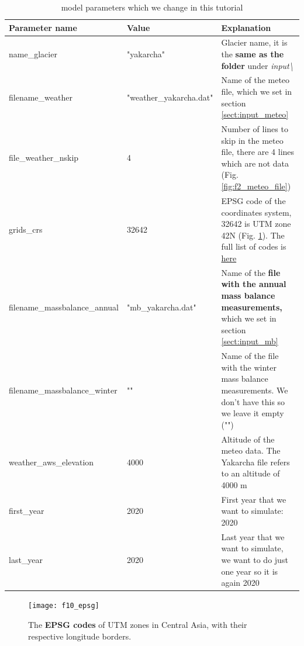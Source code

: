 \documentclass[15pt]{extarticle}
\begin{document}
\begin{table}[h!]
\caption{model parameters which we change in this tutorial}
\label{table:t1_parameters}
\centering
\begin{tabularx}{\textwidth}{|l l X|} 
 \hline
 \textbf{Parameter name} & \textbf{Value} & \textbf{Explanation} \\ [0.5ex] 
 \hline
 name\_glacier & "yakarcha" & Glacier name, it is the \textbf{same as the folder} under \textit{input\textbackslash} \\ 
 \hline
 filename\_weather & "weather\_yakarcha.dat" & Name of the meteo file, which we set in section \ref{sect:input_meteo} \\
 \hline
 file\_weather\_nskip & 4 & Number of lines to skip in the meteo file, there are 4 lines which are not data (Fig. \ref{fig:f2_meteo_file}) \\
 \hline
 grids\_crs & 32642 & EPSG code of the coordinates system, 32642 is UTM zone 42N (Fig. \ref{fig:f10_epsg}). The full list of codes is \href{https://spatialreference.org/ref/epsg/?page=80}{here} \\
 \hline
 filename\_massbalance\_annual & "mb\_yakarcha.dat" & Name of the \textbf{file with the annual mass balance measurements,} which we set in section \ref{sect:input_mb}\\
 \hline
  filename\_massbalance\_winter & "" & Name of the file with the winter mass balance measurements. We don't have this so we leave it empty ("")\\
 \hline
  weather\_aws\_elevation & 4000 & Altitude of the meteo data. The Yakarcha file refers to an altitude of 4000 m\\
 \hline
  first\_year & 2020 & First year that we want to simulate: 2020\\
 \hline
  last\_year & 2020 & Last year that we want to simulate, we want to do just one year so it is again 2020\\
 \hline
\end{tabularx}
\end{table}

\begin{figure}[hp]
    \centering
    \texttt{[image: f10\_epsg]}
    \caption{The \textbf{EPSG codes} of UTM zones in Central Asia, with their respective longitude borders.}
    \label{fig:f10_epsg}
\end{figure}

\clearpage
\end{document}
